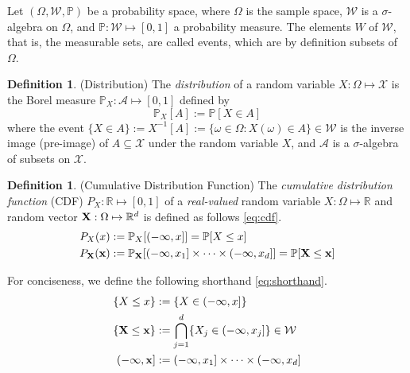 \documentclass[twoside]{article} \usepackage{aistats2017}
\theoremstyle{definition}
\newtheorem{definition}[theorem]{Definition}
\newcommand{\rv}[1]{{#1}}
\begin{document}
	Let $(\Omega, \mathcal{W}, \mathbb{P})$ be a probability space, where $\Omega$ is the sample space, $\mathcal{W}$ is a $\sigma$-algebra on $\Omega$, and $\mathbb{P} : \mathcal{W} \mapsto [0, 1]$ a probability measure. The elements $W$ of $\mathcal{W}$, that is, the measurable sets, are called events, which are by definition subsets of $\Omega$.
	
	\begin{definition} \label{def:distribution}
		(Distribution)
		The \textit{distribution} of a random variable $\rv{X} : \Omega \mapsto \mathcal{X}$ is the Borel measure $\mathbb{P}_{\rv{X}} : \mathcal{A} \mapsto [0, 1]$ defined by
		\begin{equation}
			\mathbb{P}_{\rv{X}}[A] := \mathbb{P}[\rv{X} \in A]
		\label{eq:distribution}
		\end{equation}
		where the event $\{\rv{X} \in A\} := \rv{X}^{-1}[A] := \{\omega \in \Omega : \rv{X}(\omega) \in A\} \in \mathcal{W}$ is the inverse image (pre-image) of $A \subseteq \mathcal{X}$ under the random variable $\rv{X}$, and $\mathcal{A}$ is a $\sigma$-algebra of subsets on $\mathcal{X}$.
	\end{definition}
	
	\begin{definition} \label{def:cdf}
		(Cumulative Distribution Function)
		The \textit{cumulative distribution function} (CDF) $P_{\rv{X}} : \mathbb{R} \mapsto [0, 1]$ of a \textit{real-valued} random variable $\rv{X} : \Omega \mapsto \mathbb{R}$ and random vector $\bvec{\rv{X}} : \Omega \mapsto \mathbb{R}^{d}$ is defined as follows \eqref{eq:cdf}.
		\begin{equation}
			\begin{aligned}
				P_{\rv{X}}(x) &:= \mathbb{P}_{\rv{X}}[(-\infty, x]] = \mathbb{P}[\rv{X} \leq x] \\
				P_{\bvec{\rv{X}}}(\bvec{x}) &:= \mathbb{P}_{\bvec{\rv{X}}}[(-\infty, x_{1}] \times \dots \times (-\infty, x_{d}]] = \mathbb{P}[\bvec{\rv{X}} \leq \bvec{x}] \\
			\end{aligned}
		\label{eq:cdf}
		\end{equation}

		For conciseness, we define the following shorthand \eqref{eq:shorthand}. 
		\begin{equation}
			\begin{aligned}
				\{\rv{X} \leq x\} &:= \{\rv{X} \in (-\infty, x]\} \\
				\{\bvec{\rv{X}} \leq \bvec{x}\} &:= \bigcap\limits_{j = 1}^{d} \{\rv{X}_{j} \in (-\infty, x_{j}]\} \in \mathcal{W} \\
				(-\bvec{\infty}, \bvec{x}] &:= (-\infty, x_{1}] \times \dots \times (-\infty, x_{d}] \\
			\end{aligned}
		\label{eq:shorthand}
		\end{equation}
	\end{definition}
	
\end{document}
